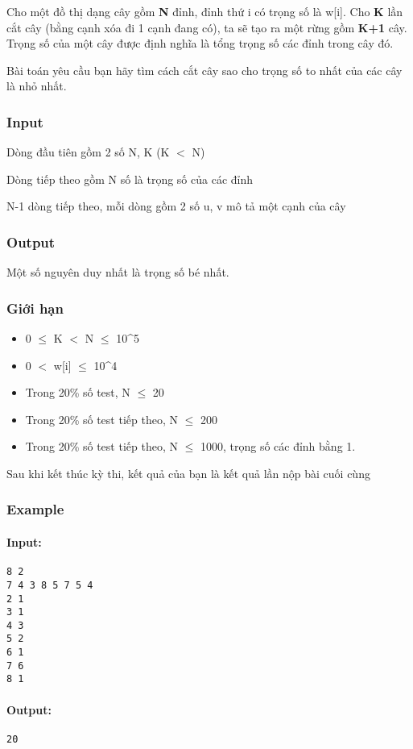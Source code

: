 



   Cho một đồ thị dạng cây gồm   \textbf{    N   }   đỉnh, đỉnh thứ i có trọng số là w[i]. Cho   \textbf{    K   }   lần cắt cây (bằng cạnh xóa đi 1 cạnh đang có), ta sẽ tạo ra một rừng gồm   \textbf{    K+1   }   cây. Trọng số của một cây được định nghĩa là tổng trọng số các đỉnh trong cây đó.  

   Bài toán yêu cầu bạn hãy tìm cách cắt cây sao cho trọng số to nhất của các cây là nhỏ nhất.  

\subsubsection{   Input  }

   Dòng đầu tiên gồm 2 số N, K (K $<$ N)  

   Dòng tiếp theo gồm N số là trọng số của các đỉnh  

   N-1 dòng tiếp theo, mỗi dòng gồm 2 số u, v mô tả một cạnh của cây  

\subsubsection{   Output  }

   Một số nguyên duy nhất là trọng số bé nhất.  

\subsubsection{   Giới hạn  }
\begin{itemize}
	\item     0  $\le$  K $<$ N  $\le$  10\textasciicircum5   
	\item     0 $<$ w[i]  $\le$  10\textasciicircum4   
	\item     Trong 20\% số test, N  $\le$  20   
	\item     Trong 20\% số test tiếp theo, N  $\le$  200   
	\item     Trong 20\% số test tiếp theo, N  $\le$  1000, trọng số các đỉnh bằng 1.   
\end{itemize}

    Sau khi kết thúc kỳ thi, kết quả của bạn là kết quả lần nộp bài cuối cùng   

\textbf{}

\subsubsection{\textbf{    Example   }}

\paragraph{   Input:  }
\begin{verbatim}
8 2
7 4 3 8 5 7 5 4
2 1
3 1
4 3
5 2
6 1
7 6
8 1\end{verbatim}

\paragraph{   Output:  }
\begin{verbatim}
20\end{verbatim}
